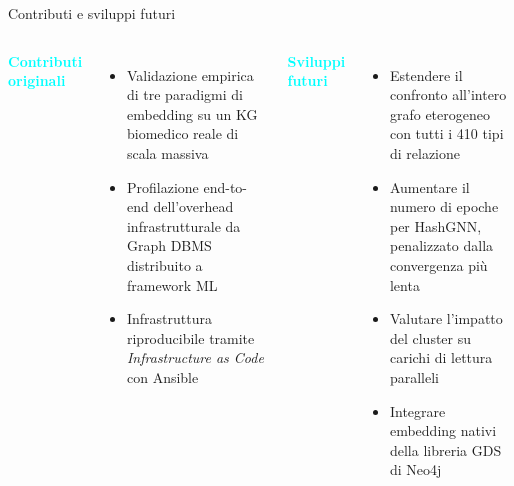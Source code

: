 \documentclass{beamer}
\begin{document}
\begin{frame}{Contributi e sviluppi futuri}

  \begin{columns}[t]
      \textcolor{Cyan}{\textbf{Contributi originali}}\\[6pt]
      \begin{itemize}
        \item Validazione empirica di tre paradigmi di embedding
          su un KG biomedico reale di scala massiva
        \item Profilazione end-to-end dell'overhead infrastrutturale
          da Graph DBMS distribuito a framework ML
        \item Infrastruttura riproducibile tramite
          \textit{Infrastructure as Code} con Ansible
      \end{itemize}

      \textcolor{Cyan}{\textbf{Sviluppi futuri}}\\[6pt]
      \begin{itemize}
        \item Estendere il confronto all'intero grafo eterogeneo
          con tutti i 410 tipi di relazione
        \item Aumentare il numero di epoche per HashGNN,
          penalizzato dalla convergenza più lenta
        \item Valutare l'impatto del cluster su carichi
          di lettura paralleli
        \item Integrare embedding nativi della libreria GDS
          di Neo4j
      \end{itemize}
  \end{columns}

\end{frame}
\end{document}
